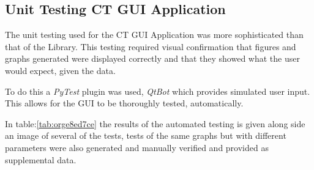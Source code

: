 \documentclass[11pt]{report}
\begin{document}
\clearpage

\subsection{Unit Testing CT GUI Application}
\label{sec:orga311405}
The unit testing used for the CT GUI Application was more sophisticated than that of the Library. This testing required visual confirmation that figures and graphs generated were displayed correctly and that they showed what the user would expect, given the data.

To do this a \emph{PyTest} plugin was used, \emph{QtBot} which provides simulated user input. This allows for the GUI to be thoroughly tested, automatically.

In table:\ref{tab:orge8ed7ce} the results of the automated testing is given along side an image of several of the tests, tests of the same graphs but with different parameters were also generated and manually verified and provided as supplemental data.
\end{document}
